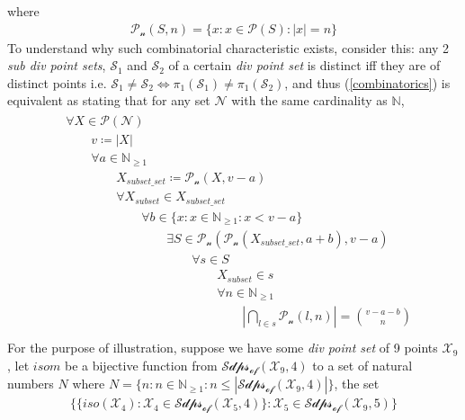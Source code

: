 \documentclass[11pt, oneside]{article}      %
\theoremstyle{definition}
\numberwithin{equation}{section}
\newcommand{\reff}[1]{(\ref{#1})}
\theoremstyle{c}
\begin{document}
where
\begin{align}
\mathcal{P_n}(S,n) = \{ x : x \in \mathcal{P}(S) : |x| = n \}
\end{align}
To understand why such combinatorial characteristic exists, consider this: any 2 \textit{sub div point sets}, $\mathscr{S}_1$ and $\mathscr{S}_2$ of a certain \textit{div point set} is distinct iff they are of distinct points  i.e. $\mathscr{S}_1\not=\mathscr{S}_2 \Leftrightarrow \pi_1(\mathscr{S}_1)\not= \pi_1(\mathscr{S}_2)$, and thus \reff{combinatorics} is equivalent as stating that for any set $\mathcal{N}$ with the same cardinality as $\mathbb{N}$,
\begin{align}
\begin{split}\label{natural-combinatorics}
&\forall X \in \mathcal{P}(\mathcal{N}) \\
&\qquad v \coloneqq |X| \\
& \qquad \forall a \in \mathbb{N}_{\geq 1} \\
&\qquad \qquad X_{subset\_set} \coloneqq \mathcal{P_n}(X, v-a)\\
&\qquad \qquad \forall X_{subset}  \in X_{subset\_set} \\
&\qquad \qquad \qquad \forall b \in \{ x: x \in \mathbb{N}_{\geq 1} : x < v-a \} \\
&\qquad \qquad \qquad \qquad \exists S \in \mathcal{P_n}( \mathcal{P_n}(X_{subset\_set}, a+b),v-a)\\
&\qquad \qquad \qquad \qquad \qquad \forall s \in S \\
&\qquad \qquad \qquad \qquad \qquad \qquad X_{subset} \in s\\
& \qquad \qquad \qquad \qquad \qquad \qquad  \forall n \in \mathbb{N}_{\geq 1}  \\
&\qquad  \qquad \qquad \qquad \qquad \qquad \qquad |\bigcap_{l \in s} \mathcal{P_n}(l,n)| =   \binom{v-a-b}{n}\\
\end{split}
\end{align}
For the purpose of illustration, suppose we have some \textit{div point set} of 9 points $\mathscr{X_9}$, let $isom$ be a bijective function from $\mathscr{Sdps_{of}}(\mathscr{X_9},4)$ to a set of natural numbers $N$ where $N = \{ n: n \in \mathbb{N}_{\geq 1} : n \leq |\mathscr{Sdps_{of}}(\mathscr{X_9},4)|\}$,  the set
\begin{align}
\{ \{ iso(\mathscr{X_4}) : \mathscr{X_4} \in \mathscr{Sdps_{of}}(\mathscr{X_5},4) \} :\mathscr{X_5} \in \mathscr{Sdps_{of}}(\mathscr{X_9},5) \}
\end{align}
\end{document}
